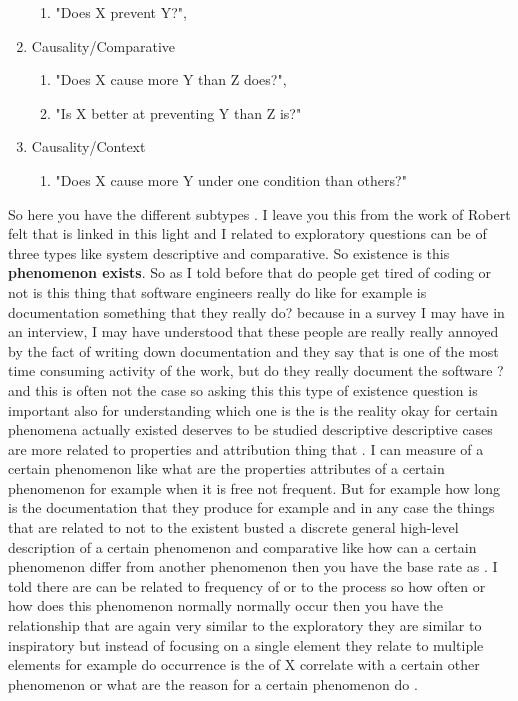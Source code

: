 \documentclass[conference, compsoc, twoside]{IEEEtran}
\begin{document}
\begin{enumerate}
\begin{enumerate}
		\item "Does X prevent Y?",
	\end{enumerate}
	\item Causality/Comparative 
	\begin{enumerate}
		\item "Does X cause more Y than Z does?",
		\item "Is X better at preventing Y than Z is?"
	\end{enumerate}
	\item Causality/Context 
	\begin{enumerate}
		\item "Does X cause more Y under one condition than others?"
	\end{enumerate}

\end{enumerate}
So here you have the different subtypes .
I leave you this from the work of Robert felt that is linked in this light and I related to exploratory questions can be of three types like system descriptive and comparative.
So existence is this \textbf{phenomenon exists}.
So as I told before that do people get tired of coding or not is this thing that software engineers really do like for example is documentation something that they really do? 
because in a survey I may have in an interview, I may have understood that these people are really really annoyed by the fact of writing down documentation and they say that is one of the most time consuming activity of the work, but do they really document the software ?
 and this is often not the case so asking this this type of existence question is important also for understanding which one is the is the reality okay for certain phenomena actually existed deserves to be studied descriptive descriptive cases are more related to properties and attribution thing that .
I can measure of a certain phenomenon like what are the properties attributes of a certain phenomenon for example when it is free not frequent.
But for example how long is the documentation that they produce for example and in any case the things that are related to not to the existent busted a discrete general high-level description of a certain phenomenon and comparative like how can a certain phenomenon differ from another phenomenon then you have the base rate as .
I told there are can be related to frequency of or to the process so how often or how does this phenomenon normally normally occur then you have the relationship that are again very similar to the exploratory they are similar to inspiratory but instead of focusing on a single element they relate to multiple elements for example do occurrence is the of X correlate with a certain other phenomenon or what are the reason for a certain phenomenon do .
\end{document}

